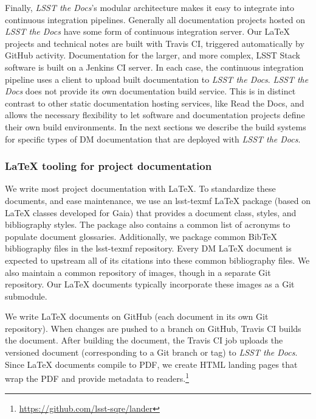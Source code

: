 Finally, \textit{LSST the Docs}'s modular architecture makes it easy to integrate into continuous integration pipelines.
Generally all documentation projects hosted on \textit{LSST the Docs} have some form of continuous integration server.
Our LaTeX projects and technical notes are built with Travis CI, triggered automatically by GitHub activity.
Documentation for the larger, and more complex, LSST Stack software is built on a Jenkins CI server.
In each case, the continuous integration pipeline uses a client to upload built documentation to \textit{LSST the Docs}.
\textit{LSST the Docs} does not provide its own documentation build service.
This is in distinct contrast to other static documentation hosting services, like Read the Docs, and allows the necessary flexibility to let software and documentation projects define their own build environments.
In the next sections we describe the build systems for specific types of DM documentation that are deployed with \textit{LSST the Docs}.

\subsubsection{LaTeX tooling for project documentation}
\label{sec:latex_tooling}

We write most project documentation with LaTeX.
To standardize these documents, and ease maintenance, we use an lsst-texmf\cite{lsst-texmf} LaTeX package (based on LaTeX classes developed for Gaia) that provides a document class, styles, and bibliography styles.
The package also contains a common list of acronyms to populate document glossaries.
Additionally, we package common BibTeX bibliography files in the lsst-texmf repository.
Every DM LaTeX document is expected to upstream all of its citations into these common bibliography files.
We also maintain a common repository of images, though in a separate Git repository.
Our LaTeX documents typically incorporate these images as a Git submodule.

We write LaTeX documents on GitHub (each document in its own Git repository).
When changes are pushed to a branch on GitHub, Travis CI builds the document.
After building the document, the Travis CI job uploads the versioned document (corresponding to a Git branch or tag) to \textit{LSST the Docs}.
Since LaTeX documents compile to PDF, we create HTML landing pages that wrap the PDF and provide metadata to readers.\footnote{\url{https://github.com/lsst-sqre/lander}}

